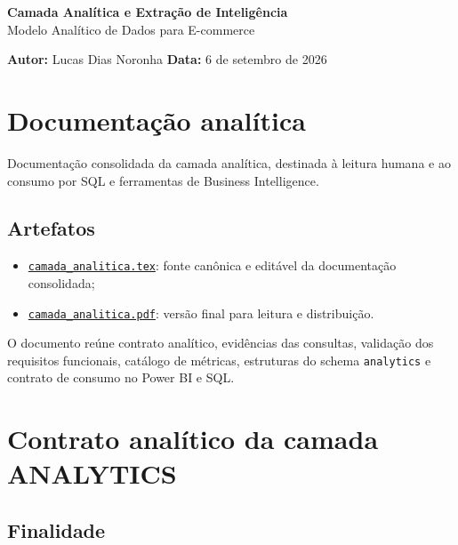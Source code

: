 \documentclass[12pt,a4paper]{article}
\begin{document}
\thispagestyle{empty}
\vspace*{\fill}
\begin{center}
  {\Huge\textcolor{AzulCorporativo}{\textbf{Camada Analítica e Extração
de Inteligência}}}\\[0.5cm]
  {\Large\textcolor{AzulPetroleo}{Modelo Analítico de Dados para E-commerce}}\\[0.8cm]
\end{center}
\vspace*{\fill}
\noindent
\textbf{\textcolor{AzulCorporativo}{Autor:}} Lucas Dias Noronha
\hfill
\textbf{\textcolor{AzulCorporativo}{Data:}} 6 de setembro de 2026

\newpage
\tableofcontents
\newpage

\section{Documentação
analítica}\label{documentacao-analitica}

Documentação consolidada da camada analítica, destinada à leitura humana
e ao consumo por SQL e ferramentas de Business Intelligence.

\subsection{Artefatos}\label{docs__analytics__readme.md__artefatos}

\begin{itemize}
\item
  \href{camada_analitica.tex}{\nolinkurl{camada_analitica.tex}}: fonte
  canônica e editável da documentação consolidada;
\item
  \href{camada_analitica.pdf}{\nolinkurl{camada_analitica.pdf}}: versão
  final para leitura e distribuição.
\end{itemize}

O documento reúne contrato analítico, evidências das consultas,
validação dos requisitos funcionais, catálogo de métricas, estruturas do
schema \nolinkurl{analytics} e contrato de consumo no Power BI e SQL.

\section{Contrato analítico da camada
ANALYTICS}\label{docs__analytics__contrato_analitico.md__contrato-analuxedtico-da-camada-analytics}

\subsection{Finalidade}\label{docs__analytics__contrato_analitico.md__finalidade}
\end{document}
